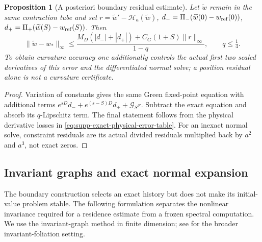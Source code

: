 \documentclass[11pt]{article}
\numberwithin{equation}{section}
\newtheorem{proposition}[proposition]{Proposition}
\theoremstyle{definition}
\theoremstyle{remark}
\begin{document}
\begin{proposition}[A posteriori boundary residual estimate]
\label{prop:supp-exact-boundary-residual}
Let $\widetilde w$ remain in the same contraction tube and set
$r=\widetilde w'-\mathcal H_a(\widetilde w)$,
$d_-=\Pi_-(\widetilde w(0)-w_{\rm ref}(0))$,
$d_+=\Pi_+(\widetilde w(S)-w_{\rm ref}(S))$. Then
\begin{equation}
 \|\widetilde w-w_*\|_\infty
 \le\frac{M_D(|d_-|+|d_+|)+C_G(1+S)\|r\|_\infty}{1-q},
 \qquad q\le\tfrac14.
 \label{eq:supp-exact-residual-bound}
\end{equation}
To obtain curvature accuracy one additionally controls the actual
first two scaled derivatives of this error and the differentiated normal
solve; a position residual alone is not a curvature certificate.
\end{proposition}
\begin{proof}
Variation of constants gives the same Green fixed-point equation with
additional terms $e^{sD}d_-+e^{(s-S)D}d_++\mathcal G_Sr$.
Subtract the exact equation and absorb its $q$-Lipschitz term. The final
statement follows from the physical derivative losses in
\eqref{eq:supp-exact-physical-error-table}. For an inexact normal solve,
constraint residuals are its actual divided residuals multiplied back by
$a^2$ and $a^3$, not exact zeros.
\end{proof}

\subsection{Invariant graphs and exact normal expansion}
\label{subsec:supp-exact-normals}

The boundary construction selects an exact history but does not make its
initial-value problem stable. The following formulation separates the
nonlinear invariance required for a residence estimate from a frozen
spectral computation. We use the invariant-graph method in finite dimension;
see \cite{BatesLuZeng} for the broader invariant-foliation setting.
\end{document}

